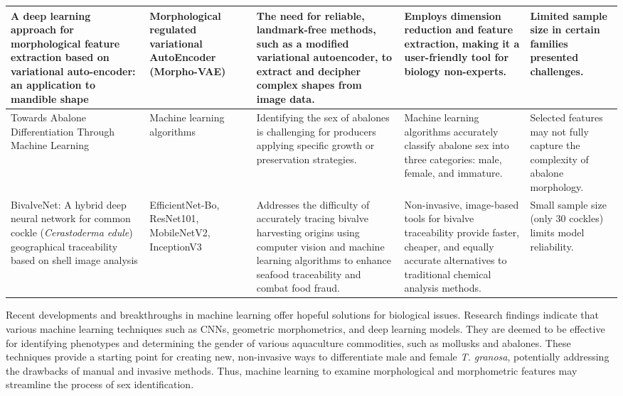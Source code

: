 \begin{landscape}
\begin{table}[]
\begin{adjustbox}{scale=0.5,center}
\begin{tabular}{|p{5cm}|p{5cm}|p{8cm}|p{8cm}|p{8cm}|}
		A deep learning approach for morphological feature extraction based on variational auto-encoder: an application to mandible shape &
		Morphological regulated variational AutoEncoder (Morpho-VAE) &
		The need for reliable, landmark-free methods, such as a modified variational autoencoder, to extract and decipher complex shapes from image data. &
		Employs dimension reduction and feature extraction, making it a user-friendly tool for biology non-experts. &
		Limited sample size in certain families presented challenges. \\ \hline
		
		Towards Abalone Differentiation Through Machine Learning &
		Machine learning algorithms &
		Identifying the sex of abalones is challenging for producers applying specific growth or preservation strategies. &
		Machine learning algorithms accurately classify abalone sex into three categories: male, female, and immature. &
		Selected features may not fully capture the complexity of abalone morphology. \\ \hline
		
		BivalveNet: A hybrid deep neural network for common cockle (\textit{Cerastoderma edule}) geographical traceability based on shell image analysis &
		EfficientNet-Bo, ResNet101, MobileNetV2, InceptionV3 &
		Addresses the difficulty of accurately tracing bivalve harvesting origins using computer vision and machine learning algorithms to enhance seafood traceability and combat food fraud. &
		Non-invasive, image-based tools for bivalve traceability provide faster, cheaper, and equally accurate alternatives to traditional chemical analysis methods. &
		Small sample size (only 30 cockles) limits model reliability. \\ \hline
		
	\end{tabular}
	\end{adjustbox}
\end{table}
\end{landscape}

Recent developments and breakthroughs in machine learning offer hopeful solutions for biological issues. Research findings indicate that various machine learning techniques such as CNNs, geometric morphometrics, and deep learning models. They are deemed to be effective for identifying phenotypes and determining the gender of various aquaculture commodities, such as mollusks and abalones. These techniques provide a starting point for creating new, non-invasive ways to differentiate male and female \textit{T. granosa}, potentially addressing the drawbacks of manual and invasive methods. Thus,  machine learning to examine morphological and morphometric features may streamline the process of sex identification.

